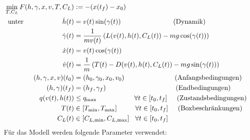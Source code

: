 \[\begin{split}
\min_{T, C_L} F(h,\gamma,x,v,T,C_L) &:= -(x(t_f) - x_0) \\\
\text{unter} \hspace{20mm} \dot{h}(t) &= v(t) \sin(\gamma(t)) \hspace{27mm} \text{(Dynamik)} \\\
\dot{\gamma}(t) &=  \dfrac{1}{mv(t)} \left( L(v(t),h(t),C_L(t)) - mg \cos(\gamma(t)) \right) \\\
\dot{x}(t) &= v(t) \cos(\gamma(t))\\\
\dot{v}(t) &= \dfrac{1}{m} \left( T(t) - D(v(t),h(t),C_L(t)) - mg \sin(\gamma(t)) \right) \\\
%
(h,\gamma,x,v)(t_0) &= (h_0,\gamma_0,x_0,v_0) \hspace{26mm} \text{(Anfangsbedingungen)}\\\
(h,\gamma)(t_f) &= (h_f,\gamma_f) \hspace{36mm} \text{(Endbedingungen)}\\\
%
q(v(t),h(t)) &\leq q_{\max} \hspace{19.5mm} \forall t \in [t_0,t_f] \hspace{5mm} \text{(Zustandsbedingungen)}\\\
T(t) &\in [T_{\min},T_{\max}] \hspace{9.5mm} \forall t \in [t_0,t_f] \hspace{5mm} \text{(Boxbeschränkungen)}\\\
C_L(t) &\in [C_{L, \min},C_{L, \max}] \hspace{3mm} \forall t \in [t_0,t_f]
\end{split} \]
Für das Modell werden folgende Parameter verwendet:
